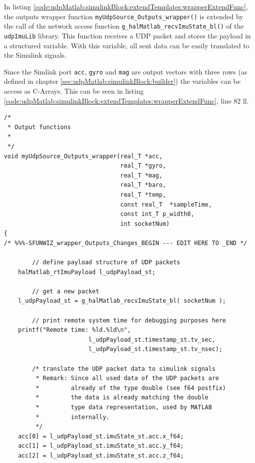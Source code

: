 In listing \ref{code:udpMatlab:simulinkBlock:extendTemplates:wrapperExtendFunc}, the outputs wrapper function \texttt{myUdpSource\_Outputs\_wrapper()} is extended by the call of the network access function \texttt{g\_halMatlab\_recvImuState\_bl()} of the \texttt{udpImuLib} library. This function receives a UDP packet and stores the payload in a structured variable. With this variable, all sent data can be easily translated to the Simulink signals.

Since the Simlink port \texttt{acc}, \texttt{gyro} and \texttt{mag} are output vectors with three rows (as defined in chapter \ref{sec:udpMatlab:simulinkBlock:builder}) the variables can be access as C-Arrays. This can be seen in listing \ref{code:udpMatlab:simulinkBlock:extendTemplates:wrapperExtendFunc}, line 82 ll.

\begin{lstlisting}[caption={[\texttt{myUdpSource\_wrapper.c} with implemented wrapper function]C-Code template file 'myUdpSource\_wrapper.c' with extended and implemented wrapper function \texttt{myUdpSource\_Outputs\_wrapper()} (code snippet of listing \ref{code:c-sFunc-Code:rawTemplateWrapper}, lines 49 ll.)},label=code:udpMatlab:simulinkBlock:extendTemplates:wrapperExtendFunc,firstnumber=49]
/*
 * Output functions
 *
 */
void myUdpSource_Outputs_wrapper(real_T *acc,
                                 real_T *gyro,
                                 real_T *mag,
                                 real_T *baro,
                                 real_T *temp, 
                                 const real_T  *sampleTime, 
                                 const int_T p_width0,
                                 int socketNum)
{
/* %%%-SFUNWIZ_wrapper_Outputs_Changes_BEGIN --- EDIT HERE TO _END */
	
		// define payload structure of UDP packets
    halMatlab_rtImuPayload l_udpPayload_st;
    
		// get a new packet
    l_udpPayload_st = g_halMatlab_recvImuState_bl( socketNum );
    
		// print remote system time for debugging purposes here
    printf("Remote time: %ld.%ld\n",
						l_udpPayload_st.timestamp_st.tv_sec,
						l_udpPayload_st.timestamp_st.tv_nsec);
    
		/* translate the UDP packet data to simulink signals
		 * Remark: Since all used data of the UDP packets are
		 *         already of the type double (see f64 postfix)
		 *         the data is already matching the double
		 *         type data representation, used by MATLAB
		 *         internally.
		 */
    acc[0] = l_udpPayload_st.imuState_st.acc.x_f64;
    acc[1] = l_udpPayload_st.imuState_st.acc.y_f64;
    acc[2] = l_udpPayload_st.imuState_st.acc.z_f64;
    

\end{lstlisting}
